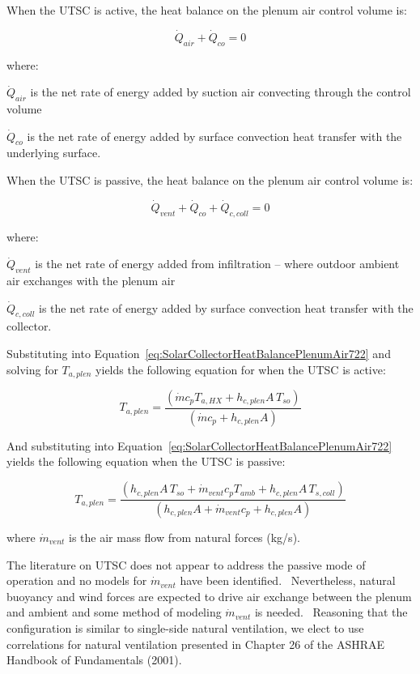 When the UTSC is active, the heat balance on the plenum air control volume is:

\begin{equation}
  \dot{Q}_{air} + \dot{Q}_{co} = 0
\label{eq:SolarCollectorHeatBalancePlenumAir722}
\end{equation}

where:

\({\dot Q_{air}}\) is the net rate of energy added by suction air convecting through the control volume

\(\dot{Q}_{co}\) is the net rate of energy added by surface convection heat transfer with the underlying surface.

When the UTSC is passive, the heat balance on the plenum air control volume is:

\begin{equation}
{\dot Q_{vent}} + {\dot Q_{co}} + {\dot Q_{c,coll}} = 0
\end{equation}

where:

\({\dot Q_{vent}}\) is the net rate of energy added from infiltration -- where outdoor ambient air exchanges with the plenum air

\({\dot Q_{c,coll}}\) is the net rate of energy added by surface convection heat transfer with the collector.

Substituting into Equation~\ref{eq:SolarCollectorHeatBalancePlenumAir722} and solving for \({T_{a,plen}}\) yields the following equation for when the UTSC is active:

\begin{equation}
{T_{a,plen}} = \frac{{\left( {\dot m{c_p}{T_{a,HX}} + {h_{c,plen}}A\,{T_{so}}} \right)}}{{\left( {\dot m{c_p} + {h_{c,plen}}A} \right)}}
\end{equation}

And substituting into Equation~\ref{eq:SolarCollectorHeatBalancePlenumAir722} yields the following equation when the UTSC is passive:

\begin{equation}
{T_{a,plen}} = \frac{{\left( {{h_{c,plen}}A\,{T_{so}} + {{\dot m}_{vent}}{c_p}{T_{amb}} + {h_{c,plen}}A\,{T_{s,coll}}} \right)}}{{\left( {{h_{c,plen}}A + {{\dot m}_{vent}}{c_p} + {h_{c,plen}}A} \right)}}
\end{equation}

where \({\dot m_{vent}}\) is the air mass flow from natural forces (kg/s).

The literature on UTSC does not appear to address the passive mode of operation and no models for \({\dot m_{vent}}\) have been identified.~ Nevertheless, natural buoyancy and wind forces are expected to drive air exchange between the plenum and ambient and some method of modeling \({\dot m_{vent}}\) is needed.~ Reasoning that the configuration is similar to single-side natural ventilation, we elect to use correlations for natural ventilation presented in Chapter 26 of the ASHRAE Handbook of Fundamentals (2001).

